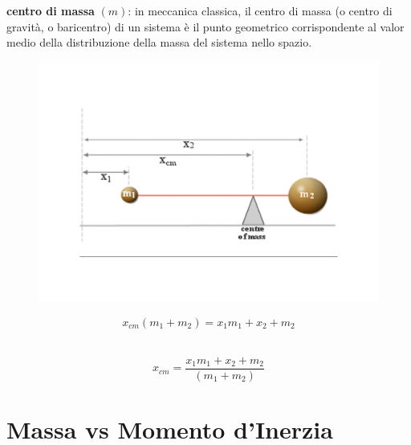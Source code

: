 \documentclass{beamer}
\begin{document}
\begin{frame}
\textbf{centro di massa} $(m)$: in meccanica classica, il centro di massa (o centro di gravità, o baricentro) di un sistema è il punto geometrico corrispondente al valor medio della distribuzione della massa del sistema nello spazio.
\pause

\begin{figure}
\includegraphics[scale=0.25]{./images/cdm}
\end{figure}
$$x_{cm} (m_1 + m_2) = x_1 m_1 + x_2 + m_2$$ \\
\pause

$$x_{cm}  = \frac{x_1 m_1 + x_2 + m_2}{(m_1 + m_2)}$$
\end{frame}
\section{Massa vs Momento d'Inerzia}
\end{document}
